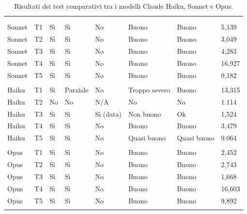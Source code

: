\begin{longtable}{|L{1.6cm}|L{0.8cm}|L{1.4cm}|L{1.4cm}|L{1.4cm}|L{1.4cm}|L{1.4cm}|L{1.4cm}|}
\hline
{}
 &  &  &  &  &  &  &  \\
\endfirsthead
\hline
{}
 &  &  &  &  &  &  &  \\
\endhead
\endfoot

\hline
{}  \\ \hline
Sonnet & T1  & Sì & Sì & No & Buono & Buono & 5,139 \\ \hline
Sonnet & T2  & Sì & Sì & No & Buono & Buono & 3,049 \\ \hline
Sonnet & T3  & Sì & Sì & No & Buono & Buono & 4,283 \\ \hline
Sonnet & T4  & Sì & Sì & No & Buono & Buono & 16,927 \\ \hline
Sonnet & T5  & Sì & Sì & No & Buono & Buono & 9,182 \\ \hline
{}  \\ \hline
Haiku & T1 & Sì & Parziale & No & Troppo severo & Buono & 13,315 \\ \hline
Haiku & T2 & No & No & N/A & No & No & 1.114 \\ \hline
Haiku & T3 & Sì & Sì & Sì (data) & Non buono & Ok & 1,524 \\ \hline
Haiku & T4 & Sì & Sì & No & Buono & Buono & 3,479 \\ \hline
Haiku & T5 & Sì & Sì & No & Quasi buono & Quasi buono & 9.064 \\ \hline
{}  \\ \hline
Opus & T1 & Sì & Sì & No & Buono & Buono & 2,452 \\ \hline
Opus & T2 & Sì & Sì & No & Buono & Buono & 2,743 \\ \hline
Opus & T3 & Sì & Sì & No & Buono & Buono & 1,668 \\ \hline
Opus & T4 & Sì & Sì & No & Buono & Buono & 16,603 \\ \hline
Opus & T5 & Sì & Sì & No & Buono & Buono & 9,892 \\ \hline
\caption{Risultati dei test comparativi tra i modelli Claude Haiku, Sonnet e Opus.}
\label{tab:test-modelli}
\end{longtable}
\endgroup

